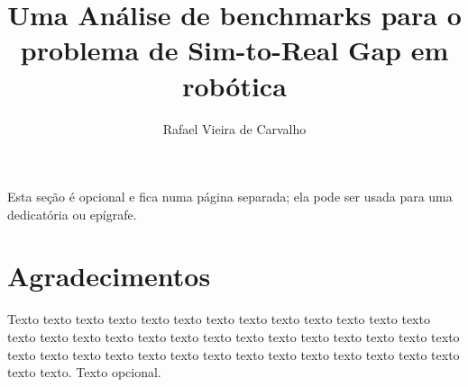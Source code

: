 \documentclass[a4paper,12pt,twoside,english,brazilian]{book}
\title{Uma Análise de benchmarks para o problema de Sim-to-Real Gap em robótica}[]
\author[fem]{Rafael Vieira de Carvalho}
\begin{document}

\frontmatter

\pagestyle{plain}

\onehalfspacing %

\maketitle %


\begin{dedicatoria}
Esta seção é opcional e fica numa página separada; ela pode ser usada para
uma dedicatória ou epígrafe.
\end{dedicatoria}


\chapter*{Agradecimentos}

Texto texto texto texto texto texto texto texto texto texto texto texto texto
texto texto texto texto texto texto texto texto texto texto texto texto texto
texto texto texto texto texto texto texto texto texto texto texto texto texto
texto texto texto texto. Texto opcional.




\end{document}
